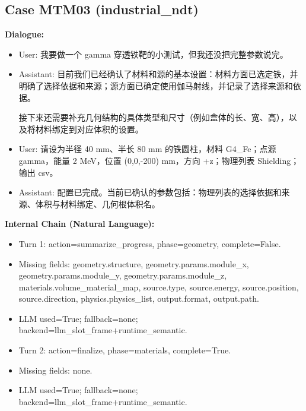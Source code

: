 \documentclass[11pt]{ctexart}
\begin{document}
\subsection{Case MTM03 (industrial\_ndt)}
\textbf{Dialogue:}
\begin{itemize}
\item User: 我要做一个 gamma 穿透铁靶的小测试，但我还没把完整参数说完。
\item Assistant: 目前我们已经确认了材料和源的基本设置：材料方面已选定铁，并明确了选择依据和来源；源方面已确定使用伽马射线，并记录了选择来源和依据。

接下来还需要补充几何结构的具体类型和尺寸（例如盒体的长、宽、高），以及将材料绑定到对应体积的设置。
\item User: 请设为半径 40 mm、半长 80 mm 的铁圆柱，材料 G4\_Fe；点源 gamma，能量 2 MeV，位置 (0,0,-200) mm，方向 +z；物理列表 Shielding；输出 csv。
\item Assistant: 配置已完成。当前已确认的参数包括：物理列表的选择依据和来源、体积与材料绑定、几何根体积名。
\end{itemize}
\textbf{Internal Chain (Natural Language):}
\begin{itemize}
\item Turn 1: action=summarize\_progress, phase=geometry, complete=False.
\item Missing fields: geometry.structure, geometry.params.module\_x, geometry.params.module\_y, geometry.params.module\_z, materials.volume\_material\_map, source.type, source.energy, source.position, source.direction, physics.physics\_list, output.format, output.path.
\item LLM used=True; fallback=none; backend=llm\_slot\_frame+runtime\_semantic.
\item Turn 2: action=finalize, phase=materials, complete=True.
\item Missing fields: none.
\item LLM used=True; fallback=none; backend=llm\_slot\_frame+runtime\_semantic.
\end{itemize}
\end{document}
